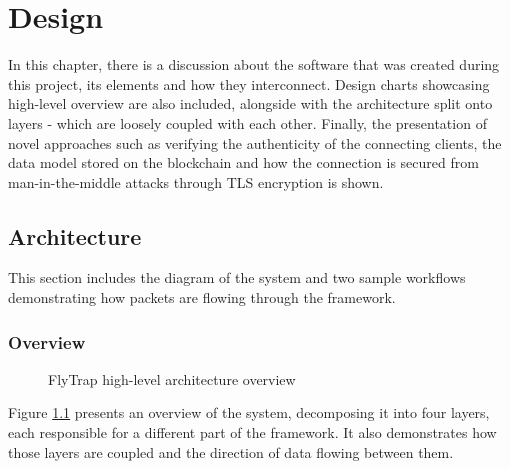 \chapter{Design\label{chap:design}}
In this chapter, there is a discussion about the software that was created during this project, its elements and how they interconnect. Design charts showcasing high-level overview are also included, alongside with the architecture split onto layers - which are loosely coupled with each other. Finally, the presentation of novel approaches such as verifying the authenticity of the connecting clients, the data model stored on the blockchain and how the connection is secured from man-in-the-middle attacks through TLS encryption is shown.

\section{Architecture}\label{sec:arch}
This section includes the diagram of the system and two sample workflows demonstrating how packets are flowing through the framework.
\subsection{Overview}
\begin{figure}[h]
    \centering
    \caption{FlyTrap high-level architecture overview}
    \label{fig:flytrap}
\end{figure}
Figure \ref{fig:flytrap} presents an overview of the system, decomposing it into four layers, each responsible for a different part of the framework. It also demonstrates how those layers are coupled and the direction of data flowing between them.

